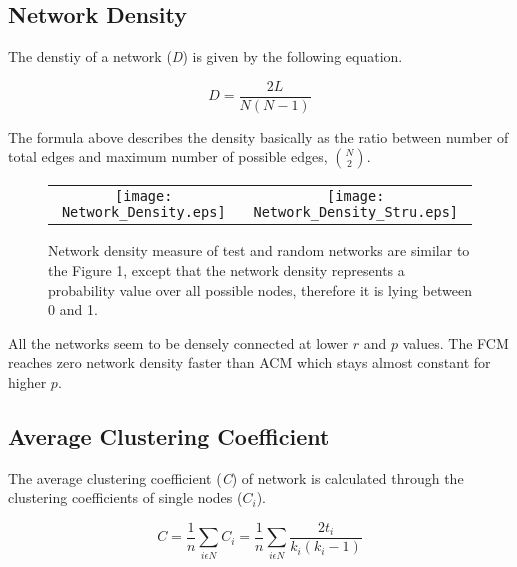 \documentclass[12pt]{article}
\begin{document}
\subsection{Network Density}

The denstiy of a network (\textit{D}) is given by the following equation.

\begin{equation}
D = \frac{2L}{N(N-1)}
\end{equation}	

The formula above describes the density basically as the ratio between number of total edges and maximum number of possible edges, ${N \choose 2} $.
	
\begin{figure}[htp]

  \centering

    \begin{tabular}{cc}


    \texttt{[image: Network\_Density.eps]} &

    \texttt{[image: Network\_Density\_Stru.eps]}\\

  \end{tabular}

 \label{figur}\caption{Network density measure of test and random networks are similar to the Figure 1, except that the network density represents a probability value over all possible nodes, therefore it is lying between 0 and 1.}

\end{figure}

All the networks seem to be densely connected at lower $r$ and $p$ values. The FCM reaches zero network density faster than ACM which stays almost constant for higher $p$.

 
\subsection{Average Clustering Coefficient}

The average clustering coefficient (\textit{C}) of network is calculated through the clustering coefficients of single nodes ($C_i$).

\begin{equation}
C = \frac{1}{n} \sum\limits_{i\epsilon N}C_i = \frac{1}{n}\sum\limits_{i\epsilon N} \frac{2t_i}{k_i(k_i -1)}
\end{equation} 
\end{document}
